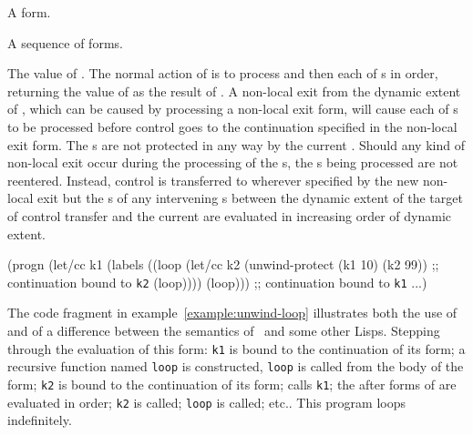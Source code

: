 \begin{optDefinition}
%
\Syntax
{}%
%
\begin{arguments}
    \item[\scdef{protected-form}] A form.
    \item[\scseqref{after-form}] A sequence of forms.
\end{arguments}
%
\result%
The value of .
%
\remarks%
The normal action of  is to process
 and then each of s in order, returning
the value of  as the result of .
A non-local exit from the dynamic extent of , which can be
caused by processing a non-local exit form, will cause each of
s to be processed before control goes to the continuation
specified in the non-local exit form.  The s are not protected
in any way by the current .  Should any kind of
non-local exit occur during the processing of the s, the
s being processed are not reentered.  Instead, control is
transferred to wherever specified by the new non-local exit but the
s of any intervening s between the
dynamic extent of the target of control transfer and the current
 are evaluated in increasing order of dynamic extent.
%
\examples
%
\begin{example}
\label{example:unwind-loop}
{\codeExample
(progn
  (let/cc k1
    (labels
      ((loop
         (let/cc k2 (unwind-protect (k1 10) (k2 99))
         ;; continuation bound to {\tt k2}
         (loop))))
      (loop)))
  ;; continuation bound to {\tt k1}
  ...)
\endCodeExample}
\end{example}
%
The code fragment in example~\ref{example:unwind-loop} illustrates both the use
of  and of a difference between the semantics of
\eulisp\ and some other Lisps.  Stepping through the evaluation of this form:
{\tt k1} is bound to the continuation of its  form; a
recursive function named {\tt loop} is constructed, {\tt loop} is called from
the body of the  form; {\tt k2} is bound to the continuation
of its  form;  calls {\tt k1}; the
after forms of  are evaluated in order; {\tt k2} is
called; {\tt loop} is called; etc..  This program loops indefinitely.
%
\end{optDefinition}

